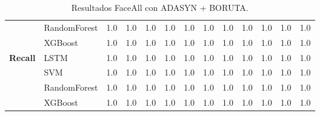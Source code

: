 \begin{table}[h]
\begin{adjustbox}{max width=11cm}
\begin{tabular}{|c|l|r|r|r|r|r|r|r|r|r|r|r|}
			& RandomForest &  1.0 &  1.0 &  1.0 &  1.0 &  1.0 &  1.0 &  1.0 &  1.0 &  1.0 &  1.0 &  1.0 \\
			& XGBoost &  1.0 &  1.0 &  1.0 &  1.0 &  1.0 &  1.0 &  1.0 &  1.0 &  1.0 &  1.0 &  1.0 \\
			\hline
			\textbf{Recall} & LSTM &  1.0 &  1.0 &  1.0 &  1.0 &  1.0 &  1.0 &  1.0 &  1.0 &  1.0 &  1.0 &  1.0 \\
			& SVM &  1.0 &  1.0 &  1.0 &  1.0 &  1.0 &  1.0 &  1.0 &  1.0 &  1.0 &  1.0 &  1.0 \\
			& RandomForest &  1.0 &  1.0 &  1.0 &  1.0 &  1.0 &  1.0 &  1.0 &  1.0 &  1.0 &  1.0 &  1.0 \\
			& XGBoost &  1.0 &  1.0 &  1.0 &  1.0 &  1.0 &  1.0 &  1.0 &  1.0 &  1.0 &  1.0 &  1.0 \\
			\hline
			
		\end{tabular}
	\end{adjustbox}
	\label{tab:faceAllADASYNBORUTA}
	\caption{Resultados FaceAll con ADASYN + BORUTA.}
\end{table}

